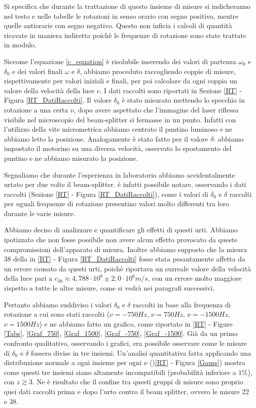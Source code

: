 \documentclass{article}
\begin{document}
Si specifica che durante la trattazione di questo insieme di misure si indicheranno nel testo e nelle tabelle le rotazioni in senso orario con segno positivo, mentre 
quelle antiorarie con segno negativo. Questo non inficia i calcoli di quantità ricavate in maniera indiretta poichè le frequenze di rotazione sono state trattate in
modulo.

Siccome l'equazione \ref{c_equation} è risolubile inserendo dei valori di partenza $\omega_0$ e $\delta_0$ e dei valori finali $\omega$ e $\delta$, abbiamo proceduto
raccogliendo coppie di misure, rispettivamente per valori iniziali e finali, per poi calcolare da ogni coppia un valore della velocità della luce $c$. I dati raccolti
sono riportati in Sezione \ref{RT} - Figura \ref{RT_DatiRaccolti}.
Il valore $\delta_0$ è stato misurato mettendo lo specchio in rotazione a una certa $\nu$, dopo avere aspettato che l'immagine del laser riflessa visibile nel microscopio
del beam-splitter si fermasse in un punto. Infatti con l'utilizzo della vite micrometrica abbiamo centrato il puntino luminoso e ne abbiamo letto la posizione.
Analogamente è stato fatto per il valore $\delta$: abbiamo impostato il motorino su una diversa velocità, osservato lo spostamento del puntino e ne abbiamo misurato la
posizione.

Segnaliamo che durante l'esperienza in laboratorio abbiamo accidentalmente urtato per due volte il beam-splitter. è infatti possibile notare, osservando i dati raccolti 
(Sezione \ref{RT} - Figura \ref{RT_DatiRaccolti}), come i valori di $\delta_0$ e $\delta$ raccolti per uguali frequenze di rotazione presentino valori molto differenti 
tra loro durante le varie misure.

Abbiamo deciso di analizzare e quantificare gli effetti di questi urti. Abbiamo ipotizzato che non fosse possibile non avere alcun effetto provocato da queste compromissioni
dell'apparato di misura. Inoltre abbiamo supposto che la misura 38 della in \ref{RT} - Figura \ref{RT_DatiRaccolti} fosse stata pesantamente affetta da un errore causato 
da questi urti, poichè riportava un surreale valore della velocità della luce pari a $c_{38}\approx 4,788 \cdot10^8 \pm 2,0 \cdot10^6 m/s$, con un errore molto maggiore 
rispetto a tutte le altre misure, come si vedrà nei paragrafi successivi. 

Pertanto abbiamo suddiviso i valori $\delta_0$ e $\delta$ raccolti in base alla frequenza di rotazione a cui sono stati raccolti ($\nu=-750Hz$, $\nu=750Hz$, 
$\nu=-1500Hz$, $\nu=1500Hz$) e ne abbiamo fatto un grafico, come riportato in \ref{RT} - Figure \ref{Tabs}, \ref{Graf_750}, \ref{Graf_1500}, \ref{Graf_-750}, 
\ref{Graf_-1500}. 
Già da un primo confronto qualitativo, osservando i grafici, era possibile osservare come le misure di $\delta_0$ e $\delta$ fossero divise in tre insiemi. Un'analisi 
quantitativa fatta applicando una distribuzione normale a ogni insieme per ogni $\nu$ ()\ref{RT} - Figura \ref{Gauss}) mostra come questi tre insiemi siano altamente incompatibili
(probabilità inferiore a $1\%$), con $z\gtrsim 3$. 
Ne è risultato che il confine tra questi gruppi di misure sono proprio quei dati raccolti prima e dopo l'urto contro il beam splitter, ovvero le misure 22 e 38.
\end{document}
